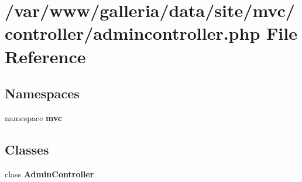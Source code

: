 \section{/var/www/galleria/data/site/mvc/controller/admincontroller.php File Reference}
\label{admincontroller_8php}
\subsection*{Namespaces}
\begin{CompactItemize}
\item 
namespace {\bf mvc}
\end{CompactItemize}
\subsection*{Classes}
\begin{CompactItemize}
\item 
class {\bf AdminController}
\end{CompactItemize}
